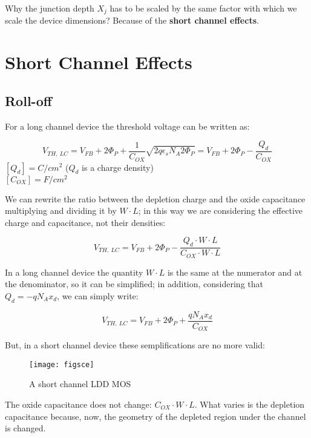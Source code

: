 \documentclass[a4paper, 12pt, twoside, openright]{report}
\begin{document}
Why the junction depth $X_{j}$ has to be scaled by the same factor with which we scale the device dimensions? Because of the \textbf{short channel effects}.

\section{Short Channel Effects}
\subsection{Roll-off}


For a long channel device the threshold voltage can be written as:

	\begin{equation}
	V_{TH,\ LC} = V_{FB} + 2\Phi_P + \frac{1}{C_{OX}} \sqrt{2q \epsilon_s N_A 2 \Phi_P} = V_{FB} + 2\Phi_P - \frac{Q_d}{C_{OX}}
	\end{equation}
	$[Q_{d}] = C/cm^2$ ($Q_{d}$ is a charge density)\\
	$[C_{OX}] = F/cm^2$

We can rewrite the ratio between the depletion charge and the oxide capacitance multiplying and dividing it by $W \cdot L$; in this way we are considering the effective charge and capacitance, not their densities:

	\begin{equation}
	V_{TH,\ LC} = V_{FB} + 2\Phi_P - \frac{Q_d \cdot W \cdot L}{C_{OX} \cdot W \cdot L}
	\end{equation}

In a long channel device the quantity $W \cdot L$ is the same at the numerator and at the denominator, so it can be simplified; in addition, considering that $Q_d = -q N_A x_d$, we can simply write:

	\begin{equation}
	V_{TH,\ LC} = V_{FB} + 2\Phi_P + \frac{q N_A x_d}{C_{OX}}
	\end{equation}

But, in a short channel device these semplifications are no more valid:

	\begin{figure}[H]
	\centering
	\texttt{[image: figsce]}
	\caption{A short channel LDD MOS}
	\label{figsce}
	\end{figure}

The oxide capacitance does not change: $C_{OX} \cdot W \cdot L$. What varies is the depletion capacitance because, now, the geometry of the depleted region under the channel is changed.
\end{document}
